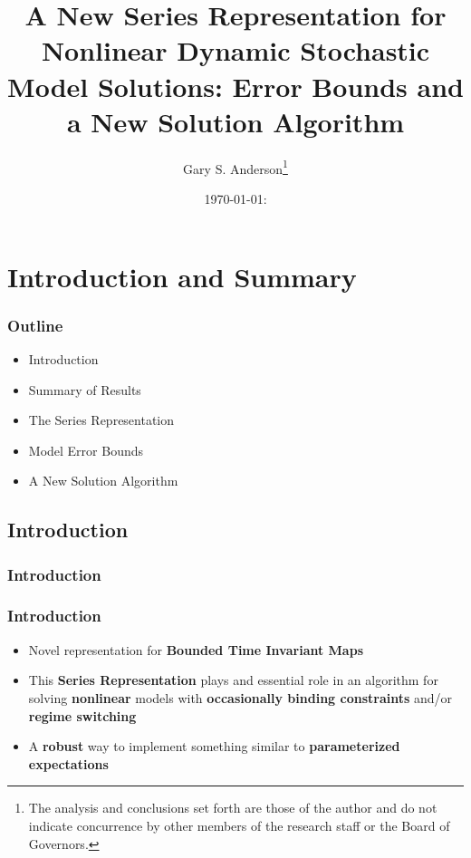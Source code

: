 \documentclass[notheorems]{beamer}
\author{Gary S. Anderson\thanks{The analysis and conclusions set forth are those of the author and do not indicate concurrence by other members of the research staff or the Board of Governors.}}
\title{A New Series Representation for 
Nonlinear Dynamic Stochastic Model Solutions:  Error Bounds and a New Solution Algorithm}
\date{\today: \currenttime}
\begin{document}
\begin{frame}
\maketitle
\end{frame}

\section{Introduction and Summary}

\begin{frame}
  \frametitle{Outline}
  \begin{itemize}
  \item Introduction
  \item Summary of Results
  \item The Series Representation
  \item Model Error Bounds
  \item A New Solution Algorithm
  \end{itemize}
\end{frame}



\subsection{Introduction}
  \frametitle{Introduction}
\label{sec:introduction0}
\begin{frame}
  \frametitle{Introduction}
  \begin{itemize}
  \item Novel representation for {\bf Bounded Time Invariant Maps}
  \item This {\bf Series Representation} plays and essential role in an algorithm for solving {\bf nonlinear} models with {\bf occasionally binding constraints} and/or {\bf regime switching}
  \item A {\bf robust} way to implement something similar to {\bf parameterized expectations}
  \end{itemize}
\end{frame}
\end{document}
